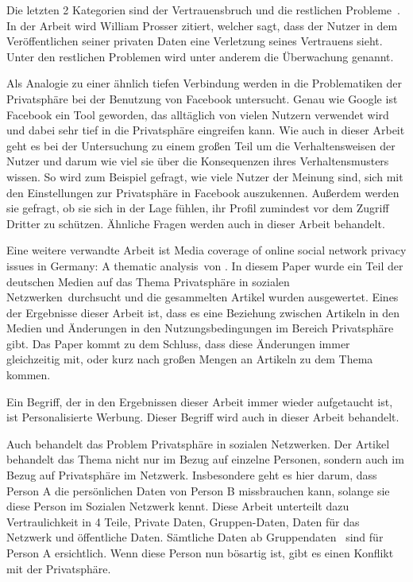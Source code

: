 Die letzten 2 Kategorien sind der Vertrauensbruch und die \glqq restlichen Probleme\grqq\ . In der Arbeit wird William Prosser zitiert, welcher sagt, dass der Nutzer in dem Veröffentlichen seiner privaten Daten eine Verletzung seines Vertrauens sieht. Unter den restlichen Problemen wird unter anderem die Überwachung genannt.

Als Analogie zu einer ähnlich tiefen Verbindung werden in \citet{debatin2009facebook} die Problematiken der Privatsphäre bei der Benutzung von Facebook untersucht. Genau wie Google ist Facebook ein Tool geworden, das alltäglich von vielen Nutzern verwendet wird und dabei sehr tief in die Privatsphäre eingreifen kann. Wie auch in dieser Arbeit geht es bei der Untersuchung zu einem großen Teil um die Verhaltensweisen der Nutzer und darum wie viel sie über die Konsequenzen ihres Verhaltensmusters wissen. So wird zum Beispiel gefragt, wie viele Nutzer der Meinung sind, sich mit den Einstellungen zur Privatsphäre in Facebook auszukennen. Außerdem werden sie gefragt, ob sie sich in der Lage fühlen, ihr Profil zumindest vor dem Zugriff Dritter zu schützen. Ähnliche Fragen werden auch in dieser Arbeit behandelt.


Eine weitere verwandte Arbeit ist \glqq Media coverage of online social network privacy issues in Germany: A thematic analysis\grqq\ von \citet{rizk2009media}. In diesem Paper wurde ein Teil der deutschen Medien auf das Thema \glqq Privatsphäre in sozialen Netzwerken\grqq\ durchsucht und die gesammelten Artikel wurden ausgewertet. Eines der Ergebnisse dieser Arbeit ist, dass es eine Beziehung zwischen Artikeln in den Medien und Änderungen in den Nutzungsbedingungen im Bereich Privatsphäre gibt. Das Paper kommt zu dem Schluss, dass diese Änderungen immer gleichzeitig mit, oder kurz nach großen Mengen an Artikeln zu dem Thema kommen.

Ein Begriff, der in den Ergebnissen dieser Arbeit immer wieder aufgetaucht ist, ist \glqq Personalisierte Werbung\grqq . Dieser Begriff wird auch in dieser Arbeit behandelt.


Auch \citet{Preibusch2007Ubiquitous} behandelt das Problem Privatsphäre in sozialen Netzwerken. Der Artikel behandelt das Thema nicht nur im Bezug auf einzelne Personen, sondern auch im Bezug auf Privatsphäre im Netzwerk. Insbesondere geht es hier darum, dass Person A die persönlichen Daten von Person B missbrauchen kann, solange sie diese Person im Sozialen Netzwerk kennt. Diese Arbeit unterteilt dazu Vertraulichkeit in 4 Teile, Private Daten, Gruppen-Daten, Daten für das Netzwerk und öffentliche Daten. Sämtliche Daten ab \glqq Gruppendaten \grqq\ sind für Person A ersichtlich. Wenn diese Person nun bösartig ist, gibt es einen Konflikt mit der Privatsphäre. 

